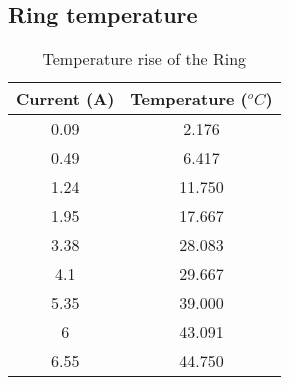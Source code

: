 \subsection{Ring temperature}
\begin{table}[h!]
	\centering
	\caption{Temperature rise of the Ring}
	\label{table:temperature_ring}
	\begin{tabular}{cc}
		\hline
		\hline
		\toprule
		\textbf{Current (A)} & \textbf{Temperature ($^oC$)}\\
		\bottomrule
		\toprule
		0.09    &    2.176    \\
		0.49    &    6.417    \\
		1.24    &    11.750    \\
		1.95    &    17.667    \\
		3.38    &    28.083    \\
		4.1        &    29.667    \\
		5.35    &    39.000    \\
		6        &    43.091    \\
		6.55    &    44.750    \\
		\bottomrule
		\hline
		\hline
	\end{tabular}
\end{table}

